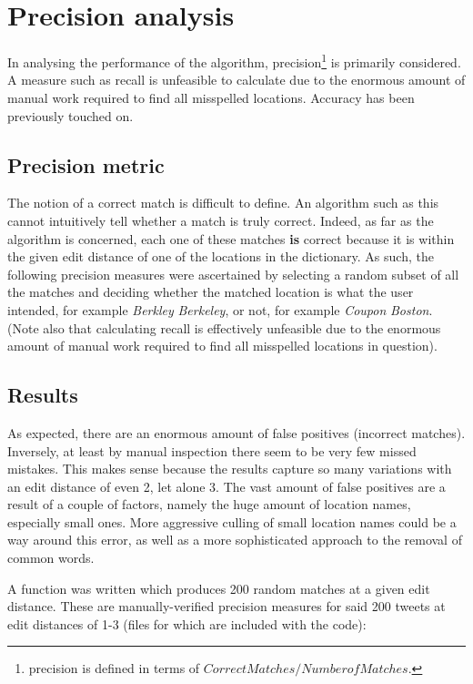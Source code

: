 \documentclass[twocolumn]{article}
\begin{document}
\section{Precision analysis}
In analysing the performance of the algorithm, precision\footnote{ precision is defined in terms of $Correct Matches/Number of Matches$.} is primarily considered. A measure such as recall is unfeasible to calculate due to the enormous amount of manual work required to find all misspelled locations. Accuracy has been previously touched on.

\subsection{Precision metric}
 The notion of a correct match is difficult to define. An algorithm such as this cannot intuitively tell whether a match is truly correct. Indeed, as far as the algorithm is concerned, each one of these matches \textbf{is} correct because it is within the given edit distance of one of the locations in the dictionary. As such, the following precision measures were ascertained by selecting a random subset of all the matches and deciding whether the matched location is what the user intended, for example \textit{Berkley} \textrightarrow \textit{Berkeley}, or not, for example \textit{Coupon} \textrightarrow \textit{Boston}. (Note also that calculating recall is effectively unfeasible due to the enormous amount of manual work required to find all misspelled locations in question).

\subsection{Results}
As expected, there are an enormous amount of false positives (incorrect matches). Inversely, at least by manual inspection there seem to be very few missed mistakes. This makes sense because the results capture so many variations with an edit distance of even 2, let alone 3. The vast amount of false positives are a result of a couple of factors, namely the huge amount of location names, especially small ones. More aggressive culling of small location names could be a way around this error, as well as a more sophisticated approach to the removal of common words.

A function was written which produces 200 random matches at a given edit distance. These are manually-verified precision measures for said 200 tweets at edit distances of 1-3 (files for which are included with the code):
\end{document}
